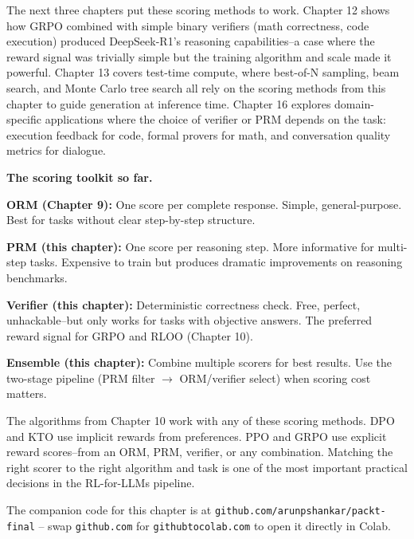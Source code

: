 \begin{chapterenv}
The next three chapters put these scoring methods to work. Chapter 12 shows how GRPO combined with simple binary verifiers (math correctness, code execution) produced DeepSeek-R1's reasoning capabilities--a case where the reward signal was trivially simple but the training algorithm and scale made it powerful. Chapter 13 covers test-time compute, where best-of-N sampling, beam search, and Monte Carlo tree search all rely on the scoring methods from this chapter to guide generation at inference time. Chapter 16 explores domain-specific applications where the choice of verifier or PRM depends on the task: execution feedback for code, formal provers for math, and conversation quality metrics for dialogue.

\begin{infobox}
\textbf{The scoring toolkit so far.}

\textbf{ORM (Chapter 9):} One score per complete response. Simple, general-purpose. Best for tasks without clear step-by-step structure.

\textbf{PRM (this chapter):} One score per reasoning step. More informative for multi-step tasks. Expensive to train but produces dramatic improvements on reasoning benchmarks.

\textbf{Verifier (this chapter):} Deterministic correctness check. Free, perfect, unhackable--but only works for tasks with objective answers. The preferred reward signal for GRPO and RLOO (Chapter 10).

\textbf{Ensemble (this chapter):} Combine multiple scorers for best results. Use the two-stage pipeline (PRM filter $\to$ ORM/verifier select) when scoring cost matters.

The algorithms from Chapter 10 work with any of these scoring methods. DPO and KTO use implicit rewards from preferences. PPO and GRPO use explicit reward scores--from an ORM, PRM, verifier, or any combination. Matching the right scorer to the right algorithm and task is one of the most important practical decisions in the RL-for-LLMs pipeline.
\end{infobox}


The companion code for this chapter is at \texttt{github.com/arunpshankar/packt-final} -- swap \texttt{github.com} for \texttt{githubtocolab.com} to open it directly in Colab.

\end{chapterenv}